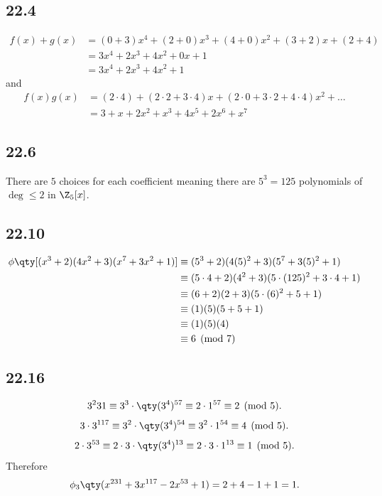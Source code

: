 \documentclass[12pt,titlepage]{extarticle}
\begin{document}

\subsection*{22.4}
\begin{align*}
    f(x) + g(x) &= (0+3)x^4 + (2+0)x^3 + (4+0)x^2 + (3+2)x + (2+4) \\
    &= 3x^4 + 2x^3 + 4x^2 + 0x + 1 \\
    &= 3x^4 + 2x^3 + 4x^2 + 1
\end{align*}
and
\begin{align*}
    f(x)g(x) &= (2\cdot 4) + (2\cdot 2 + 3\cdot 4)x + (2 \cdot 0 + 3 \cdot 2 + 4 \cdot 4)x^2 + \ldots \\
    &= 3 + x + 2x^2 + x^3 + 4x^5 + 2x^6 + x^7
\end{align*}

\subsection*{22.6}
There are $5$ choices for each coefficient meaning there are $5^3 = 125$ polynomials of $\deg \leq 2$ in $\Z_5[x]$.

\subsection*{22.10}
\begin{align*}
    \phi\qty[(x^3+2)(4x^2+3)(x^7+3x^2+1)] &\equiv (5^3+2)(4(5)^2 + 3)(5^7 + 3(5)^2 + 1) \\
    &\equiv (5\cdot 4 + 2)(4^2 + 3)(5\cdot(125)^2 + 3\cdot 4 + 1) \\
    &\equiv (6 + 2)(2 + 3)(5\cdot(6)^2 + 5 + 1) \\
    &\equiv (1)(5)(5 + 5 + 1) \\
    &\equiv (1)(5)(4) \\
    &\equiv 6 \pmod{7}
\end{align*}

\subsection*{22.16}
\[
    3^231 \equiv 3^{3} \cdot \qty(3^{4})^{57} \equiv 2 \cdot 1^{57} \equiv 2 \pmod{5}
.\]
\[
    3\cdot 3^{117} \equiv 3^{2} \cdot \qty(3^{4})^{54} \equiv 3^2 \cdot 1^{54} \equiv 4 \pmod{5}
.\]
\[
    2 \cdot 3^{53} \equiv 2 \cdot 3 \cdot \qty(3^4)^{13} \equiv 2 \cdot 3 \cdot 1^{13} \equiv 1 \pmod{5}
.\]
Therefore
\[
    \phi_3\qty(x^{231} + 3x^{117} - 2x^{53} + 1) = 2 + 4 - 1 + 1 = 1
.\]
\end{document}
